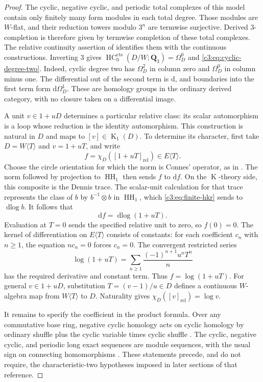 \documentclass[11pt,a4paper]{amsart}
\numberwithin{equation}{section}
\theoremstyle{definition}
\theoremstyle{remark}
\newcommand{\CthreeQ}{\mathbf{Q}}
\newcommand{\Cthreedd}{\mathrm{d}}
\newcommand{\Cthreects}{\mathrm{cts}}
\newcommand{\Cthreerel}{\mathrm{rel}}
\DeclareMathOperator{\CthreeK}{K}
\DeclareMathOperator{\CthreeHH}{HH}
\DeclareMathOperator{\CthreeHC}{HC}
\DeclareMathOperator{\Cthreedlog}{dlog}
\begin{document}
\begin{proof}
The cyclic, negative cyclic, and periodic total complexes of this
model contain only finitely many form modules in each total degree.
Those modules are $W$-flat, and their reduction towers modulo $3^n$
are termwise surjective.
Derived $3$-completion is therefore given by termwise completion
of these total complexes.
The relative continuity assertion of
\cite[Proposition~4.2 and the paragraph preceding
Proposition~4.10]{AMMN} identifies them with the continuous
constructions. Inverting $3$ gives
$\CthreeHC^\Cthreects_0(D/W;\CthreeQ_3)=\Omega_D^0$ and
\eqref{c3:eq:cyclic-degree-two}.
Indeed, cyclic degree two has $\Omega_D^2$ in column zero and
$\Omega_D^0$ in column minus one.
The differential out of the second term is $\Cthreedd$, and boundaries
into the first term form $\Cthreedd\Omega_D^1$.
These are homology groups in the ordinary derived category, with
no closure taken on a differential image.

A unit $v\in1+uD$ determines a particular relative class: its scalar
automorphism is a loop whose reduction is the identity automorphism.
This construction is natural in $D$ and maps to $[v]\in\CthreeK_1(D)$.
To determine its character, first take $D=W\langle T\rangle$ and
$v=1+uT$, and write
\[
 f=\chi_D([1+uT]_{\Cthreerel})\in E\langle T\rangle.
\]
Choose the circle orientation for which the norm is Connes' operator,
as in \cite[Lemma~2.2 and Theorem~2.3]{HoyoisCircle}.
The norm followed by projection to $\CthreeHH_1$ then sends $f$ to $\Cthreedd f$.
On the $\CthreeK$-theory side, this composite is the Dennis trace.
The scalar-unit calculation for that trace represents the class of
$b$ by $b^{-1}\otimes b$ in $\CthreeHH_1$, which
\eqref{c3:eq:finite-hkr} sends to $\Cthreedlog b$.
It follows that
\[
 \Cthreedd f=\Cthreedlog(1+uT).
\]
Evaluation at $T=0$ sends the specified relative unit to zero, so
$f(0)=0$.
The kernel of differentiation on $E\langle T\rangle$ consists of
constants: for each coefficient $c_n$ with $n\geq1$, the equation
$n c_n=0$ forces $c_n=0$.
The convergent restricted series
\[
 \log(1+uT)
   =\sum_{n\geq1}\frac{(-1)^{n+1}u^nT^n}{n}
\]
has the required derivative and constant term.
Thus $f=\log(1+uT)$.
For general $v\in1+uD$, substitution
$T=(v-1)/u\in D$ defines a continuous $W$-algebra map from
$W\langle T\rangle$ to $D$.
Naturality gives $\chi_D([v]_{\Cthreerel})=\log v$.

It remains to specify the coefficient in the product formula.
Over any commutative base ring, negative cyclic homology acts on
cyclic homology by ordinary shuffle plus the cyclic variable times
cyclic shuffle
\cite[\S2, Definition~2.1 and Remark~2.2]{BokstedtOttosen}.
The cyclic, negative cyclic, and periodic long exact sequences are
module sequences, with the usual sign on connecting homomorphisms
\cite[Proposition~2.3]{BokstedtOttosen}.
These statements precede, and do not require, the characteristic-two
hypotheses imposed in later sections of that reference.


\end{proof}
\end{document}
